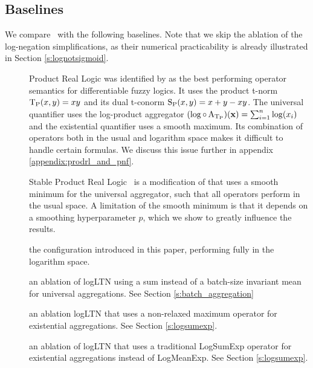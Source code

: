 \documentclass{article}
\theoremstyle{definition}
\begin{document}
\subsection{Baselines}
We compare \logLTN\ with the following baselines. 
Note that we skip the ablation of the log-negation simplifications, as their numerical practicability is already illustrated in Section \ref{s:lognotsigmoid}.
\begin{description}
    \item[\ProdRL] Product Real Logic was identified by \cite{van_krieken_analyzing_2022} as the best performing operator semantics for differentiable fuzzy logics.
    It uses the product t-norm $\operatorname{T_{P}}(x,y)=xy$ and its dual t-conorm $\operatorname{S_{P}}(x,y)=x+y-xy$.
    The universal quantifier uses the log-product aggregator $(\log \circ \operatorname{A_{\operatorname{T_{P}}}})(\mathbf{x}) = \sum_{i=1}^{n} \log(x_i)$
    and the existential quantifier uses a smooth maximum.
    Its combination of operators both in the usual and logarithm space makes it difficult to handle certain formulas. 
    We discuss this issue further in appendix \ref{appendix:prodrl_and_pnf}.
    \item[\StableRL] Stable Product Real Logic~\cite{badreddine_logic_2022} is a modification of \ProdRL that uses a smooth minimum for the universal aggregator,
    such that all operators perform in the usual space.
    A limitation of the smooth minimum is that it depends on a smoothing hyperparameter $p$, which we show to greatly influence the results.
    \item[\logLTN] the configuration introduced in this paper, performing fully in the logarithm space.
    \item[\logLTNsum] an ablation of logLTN using a sum instead of a batch-size invariant mean for universal aggregations. See Section \ref{s:batch_aggregation}
    \item[\logLTNmax]  an ablation logLTN that uses a non-relaxed maximum operator for existential aggregations. See Section \ref{s:logsumexp}.
    \item[\logLTNLSE] an ablation of logLTN that uses a traditional LogSumExp operator for existential aggregations instead of LogMeanExp. See Section \ref{s:logsumexp}.
\end{description}
\end{document}
